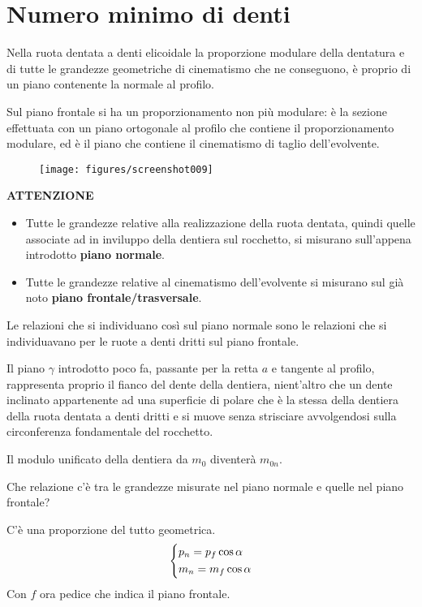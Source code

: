 \documentclass[a4paper, 15pt]{article}
\begin{document}
\section{Numero minimo di denti}
\begin{adjustwidth}{2in}{}		
Nella ruota dentata a denti elicoidale la proporzione modulare della dentatura e di tutte le grandezze geometriche di cinematismo che ne conseguono, è proprio di un piano contenente la normale al profilo. 

Sul piano frontale si ha un proporzionamento non più modulare: è la sezione effettuata con un piano ortogonale al profilo che contiene il proporzionamento modulare, ed è il piano che contiene il cinematismo di taglio dell'evolvente. 	
\begin{figure}[H]
	\centering
	\texttt{[image: figures/screenshot009]}
	\label{fig:screenshot009}
\end{figure}
\textbf{ATTENZIONE}
\begin{itemize}
	\item Tutte le grandezze relative alla realizzazione della ruota dentata, quindi quelle associate ad in inviluppo della dentiera sul rocchetto,  si misurano sull'appena introdotto \textbf{piano normale}. 
	
	\item Tutte le grandezze relative al cinematismo dell'evolvente si misurano sul già noto \textbf{piano frontale/trasversale}. 
\end{itemize}

Le relazioni che si individuano così sul piano normale sono le relazioni che si individuavano per le ruote a denti dritti sul piano frontale. \newline 

Il piano $\gamma$ introdotto poco fa, passante per la retta $a$ e tangente al profilo, rappresenta proprio il  fianco del dente della dentiera, nient'altro che un dente inclinato appartenente ad una superficie di polare che è la stessa della dentiera della ruota dentata a denti dritti e si muove senza strisciare  avvolgendosi sulla circonferenza fondamentale del rocchetto. \newline 

Il modulo unificato della dentiera da $m_0$ diventerà $m_{0n}$. \newline

Che relazione c'è tra le grandezze misurate nel piano normale e quelle nel piano frontale? 

C'è una proporzione del tutto geometrica. 
\[\begin{dcases}
	p_n = p_f\cos\alpha\ \\
	m_n = m_f\cos\alpha \\	
\end{dcases}\]
Con $f$ ora pedice che indica il piano frontale. 


\end{adjustwidth}
\end{document}
